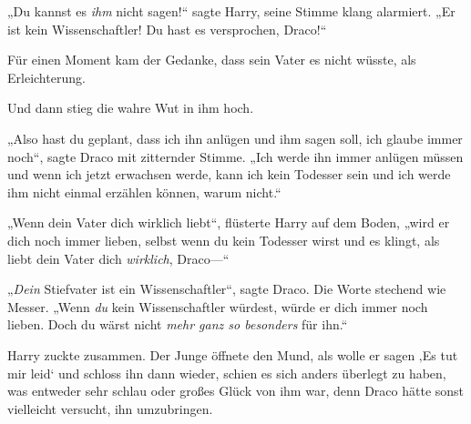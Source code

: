„Du kannst es \emph{ihm} nicht sagen!“ sagte Harry, seine Stimme klang alarmiert.
„Er ist kein Wissenschaftler! Du hast es versprochen, Draco!“

Für einen Moment kam der Gedanke, dass sein Vater es nicht wüsste, als Erleichterung.

Und dann stieg die wahre Wut in ihm hoch.

„Also hast du geplant, dass ich ihn anlügen und ihm sagen soll, ich glaube immer noch“, sagte Draco mit zitternder Stimme.
„Ich werde ihn immer anlügen müssen und wenn ich jetzt erwachsen werde, kann ich kein Todesser sein und ich werde ihm nicht einmal erzählen können, warum nicht.“

„Wenn dein Vater dich wirklich liebt“, flüsterte Harry auf dem Boden, „wird er dich noch immer lieben, selbst wenn du kein Todesser wirst und es klingt, als liebt dein Vater dich \emph{wirklich}, Draco—“

„\emph{Dein} Stiefvater ist ein Wissenschaftler“, sagte Draco. Die Worte stechend wie Messer.
„Wenn \emph{du} kein Wissenschaftler würdest, würde er dich immer noch lieben. Doch du wärst nicht \emph{mehr ganz so besonders} für ihn.“

Harry zuckte zusammen. Der Junge öffnete den Mund, als wolle er sagen ‚Es tut mir leid‘ und schloss ihn dann wieder, schien es sich anders überlegt zu haben, was entweder sehr schlau oder großes Glück von ihm war, denn Draco hätte sonst vielleicht versucht, ihn umzubringen.

